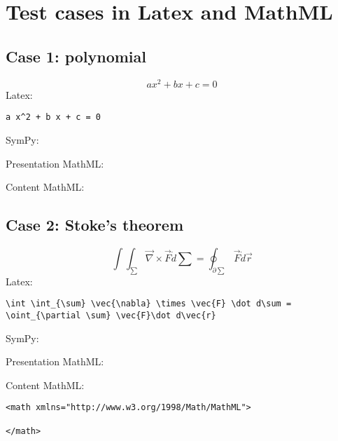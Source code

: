 \section{Test cases in Latex and MathML}\label{sec:appendix_test_cases}

\subsection{Case 1: polynomial}

\begin{equation}
a x^2 + b x + c = 0
\label{eq:polynomial_case1}
\end{equation}
Latex: 
\begin{verbatim}
a x^2 + b x + c = 0
\end{verbatim}

SymPy:


Presentation MathML:




Content MathML:


\subsection{Case 2: Stoke's theorem}
\begin{equation}
\int \int_{\sum} \vec{\nabla} \times \vec{F} \dot d\sum = \oint_{\partial \sum} \vec{F}\dot d\vec{r}
\label{eq:stokes_case2}
\end{equation}
Latex:
\begin{verbatim}
\int \int_{\sum} \vec{\nabla} \times \vec{F} \dot d\sum = 
\oint_{\partial \sum} \vec{F}\dot d\vec{r}
\end{verbatim}

SymPy:



Presentation MathML:


Content MathML:
\begin{verbatim}
<math xmlns="http://www.w3.org/1998/Math/MathML">

</math>
\end{verbatim}

